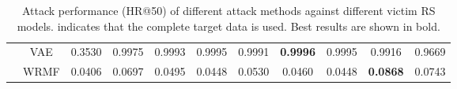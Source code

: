 \begin{table}[t]
{\begin{tabular}{c|c|ccccccccc}
		                            & VAE                        & 0.3530 & 0.9975          & 0.9993          & 0.9995 & 0.9991          & \textbf{0.9996} & 0.9995          & 0.9916          & 0.9669          \\
		                            & WRMF                       & 0.0406 & 0.0697          & 0.0495          & 0.0448 & 0.0530          & 0.0460          & 0.0448          & \textbf{0.0868} & 0.0743          \\ \hline
		\end{tabular}
	}
	\caption{Attack performance (HR@50) of different attack methods against different victim RS models. \oursstar indicates that the complete target data is used. Best results are shown in bold.}
	\label{tab:main_exp}
\end{table}

